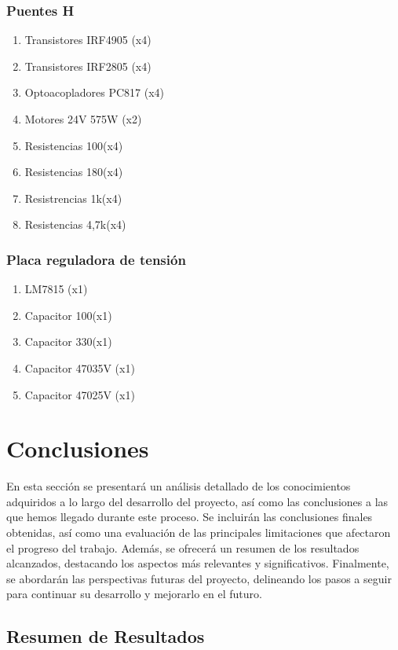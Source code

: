 \documentclass{article}
\begin{document}
\subsubsection{Puentes H}
\begin{enumerate}
    \item Transistores IRF4905 (x4)
    \item Transistores IRF2805 (x4)
    \item Optoacopladores PC817 (x4)
    \item Motores 24V 575W (x2)
    \item Resistencias 100\Ω (x4)
    \item Resistencias 180\Ω (x4)
    \item Resistrencias 1k\Ω (x4)
    \item Resistencias 4,7k\Ω (x4)
\end{enumerate}

\subsubsection{Placa reguladora de tensión}
\begin{enumerate}
    \item LM7815 (x1)
    \item Capacitor 100 (x1)
    \item Capacitor 330 (x1)
    \item Capacitor 470 35V (x1)
    \item Capacitor 470 25V (x1)
\end{enumerate}

\section{Conclusiones}
En esta sección se presentará un análisis detallado de los conocimientos adquiridos a lo largo del desarrollo del proyecto, así como las conclusiones a las que hemos llegado durante este proceso. Se incluirán las conclusiones finales obtenidas, así como una evaluación de las principales limitaciones que afectaron el progreso del trabajo. Además, se ofrecerá un resumen de los resultados alcanzados, destacando los aspectos más relevantes y significativos. Finalmente, se abordarán las perspectivas futuras del proyecto, delineando los pasos a seguir para continuar su desarrollo y mejorarlo en el futuro.


\subsection{Resumen de Resultados}
\end{document}
